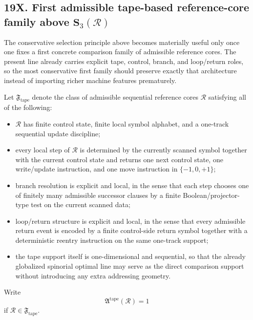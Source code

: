 \subsection*{19X. First admissible tape-based reference-core family above \(\mathbf S_3(\mathcal R)\)}
The conservative selection principle above becomes materially useful only once one fixes a first concrete comparison family of admissible reference cores. The present line already carries explicit tape, control, branch, and loop/return roles, so the most conservative first family should preserve exactly that architecture instead of importing richer machine features prematurely.

\begin{definition}
Let \(\mathfrak F_{\mathrm{tape}}\) denote the class of admissible sequential reference cores \(\mathcal R\) satisfying all of the following:
\begin{itemize}[leftmargin=2em]
  \item \(\mathcal R\) has finite control state, finite local symbol alphabet, and a one-track sequential update discipline;
  \item every local step of \(\mathcal R\) is determined by the currently scanned symbol together with the current control state and returns one next control state, one write/update instruction, and one move instruction in \(\{-1,0,+1\}\);
  \item branch resolution is explicit and local, in the sense that each step chooses one of finitely many admissible successor clauses by a finite Boolean/projector-type test on the current scanned data;
  \item loop/return structure is explicit and local, in the sense that every admissible return event is encoded by a finite control-side return symbol together with a deterministic reentry instruction on the same one-track support;
  \item the tape support itself is one-dimensional and sequential, so that the already globalized spinorial optimal line may serve as the direct comparison support without introducing any extra addressing geometry.
\end{itemize}
Write
\[
\mathfrak A^{\mathrm{tape}}(\mathcal R)=1
\]
if \(\mathcal R\in\mathfrak F_{\mathrm{tape}}\).
\end{definition}

